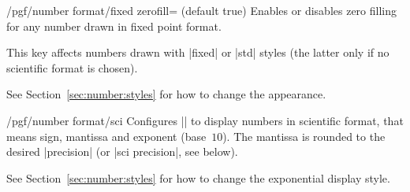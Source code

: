 \begin{key}{/pgf/number format/fixed zerofill=  (default true)}
    Enables or disables zero filling for any number drawn in fixed point
    format.
\begin{codeexample}[pre={\begin{lateximage}},post={\end{lateximage}}]
\hspace{1em}
\hspace{1em}
\hspace{1em}
\hspace{1em}
\end{codeexample}
    This key affects numbers drawn with |fixed| or |std| styles (the latter
    only if no scientific format is chosen).
\begin{codeexample}[pre={\begin{lateximage}},post={\end{lateximage}}]
\hspace{1em}
\hspace{1em}
\hspace{1em}
\end{codeexample}

    See Section~\ref{sec:number:styles} for how to change the appearance.
\end{key}

\begin{key}{/pgf/number format/sci}
    Configures |\pgfmathprintnumber| to display numbers in scientific format,
    that means sign, mantissa and exponent (base~$10$). The mantissa is rounded
    to the desired |precision| (or |sci precision|, see below).
\begin{codeexample}[pre={\begin{lateximage}},post={\end{lateximage}}]
\hspace{1em}
\hspace{1em}
\hspace{1em}
\hspace{1em}
\end{codeexample}

    See Section~\ref{sec:number:styles} for how to change the exponential
    display style.
\end{key}

